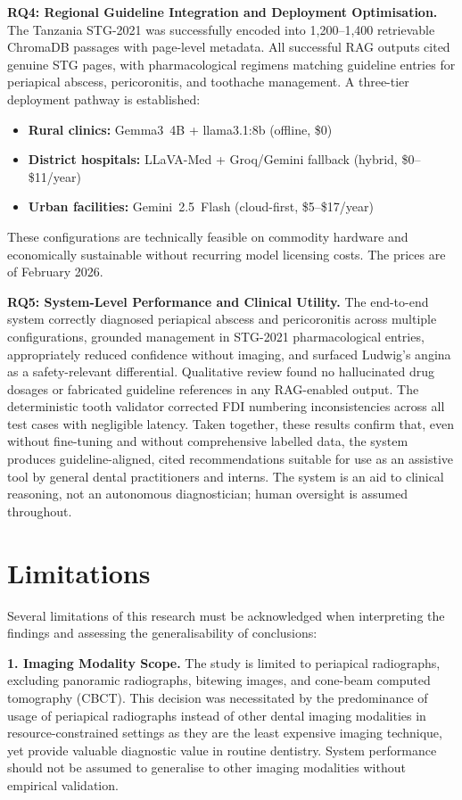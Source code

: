 \documentclass[12pt,a4paper]{report}
\begin{document}
	\textbf{RQ4: Regional Guideline Integration and Deployment Optimisation.}
	The Tanzania STG-2021 was successfully encoded into 1,200--1,400 retrievable
	ChromaDB passages with page-level metadata. All successful RAG outputs cited
	genuine STG pages, with pharmacological regimens matching guideline entries for
	periapical abscess, pericoronitis, and toothache management. A three-tier
	deployment pathway is established:
	\begin{itemize}
		\item \textbf{Rural clinics:} Gemma3~4B + llama3.1:8b (offline, \$0)
		\item \textbf{District hospitals:} LLaVA-Med + Groq/Gemini fallback (hybrid,
		\$0--\$11/year)
		\item \textbf{Urban facilities:} Gemini~2.5~Flash (cloud-first,
		\$5--\$17/year)
	\end{itemize}
	These configurations are technically feasible on commodity hardware and
	economically sustainable without recurring model licensing costs. The prices are of February 2026.
	
	\textbf{RQ5: System-Level Performance and Clinical Utility.}
	The end-to-end system correctly diagnosed periapical abscess and pericoronitis
	across multiple configurations, grounded management in STG-2021 pharmacological
	entries, appropriately reduced confidence without imaging, and surfaced Ludwig's
	angina as a safety-relevant differential. Qualitative review found no hallucinated
	drug dosages or fabricated guideline references in any RAG-enabled output. The
	deterministic tooth validator corrected FDI numbering inconsistencies across
	all test cases with negligible latency. Taken together, these results
	confirm that, even without fine-tuning and without comprehensive labelled data,
	the system produces guideline-aligned, cited recommendations suitable for use
	as an assistive tool by general dental practitioners and interns. The system is
	an aid to clinical reasoning, not an autonomous diagnostician; human oversight
	is assumed throughout.
	
	
	\section{Limitations}
	\label{sec:limitations}
	
	Several limitations of this research must be acknowledged when interpreting the findings and assessing the generalisability of conclusions:
	
	\textbf{1. Imaging Modality Scope.} The study is limited to periapical radiographs, excluding panoramic radiographs, bitewing images, and cone-beam computed tomography (CBCT). This decision was necessitated by the predominance of usage of periapical radiographs instead of other dental imaging modalities in resource-constrained settings as they are the least expensive imaging technique, yet provide valuable diagnostic value in routine dentistry. System performance should not be assumed to generalise to other imaging modalities without empirical validation.
	
\end{document}

